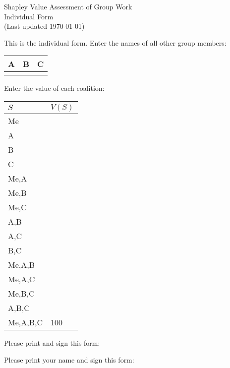\documentclass[12pt]{article}
\begin{document}
\begin{center}
\Large{Shapley Value Assessment of Group Work}\\
Individual Form\\
\tiny{(Last updated \today)}
\end{center}
This is the individual form. Enter the names of all other group members:
\vspace{1cm}

\begin{center}
\begin{tabular}{p{3cm}|p{3cm}|p{3cm}}
A&B&C\\
\hline
&&
\end{tabular}
\end{center}
\vspace{1cm}

Enter the value of each coalition:
\vspace{.5cm}

\begin{center}
\begin{tabular}{l|p{2cm}}
$S$&$V(S)$\\\hline
Me&\\\hline
A&\\\hline
B&\\\hline
C&\\\hline
Me,A&\\\hline
Me,B&\\\hline
Me,C&\\\hline
A,B&\\\hline
A,C&\\\hline
B,C&\\\hline
Me,A,B&\\\hline
Me,A,C&\\\hline
Me,B,C&\\\hline
A,B,C&\\\hline
Me,A,B,C&100\\\hline
\end{tabular}
\end{center}
\vspace{.5cm}

Please print and sign this form:

\vspace{.5cm}
Please print your name and sign this form:
\end{document}
